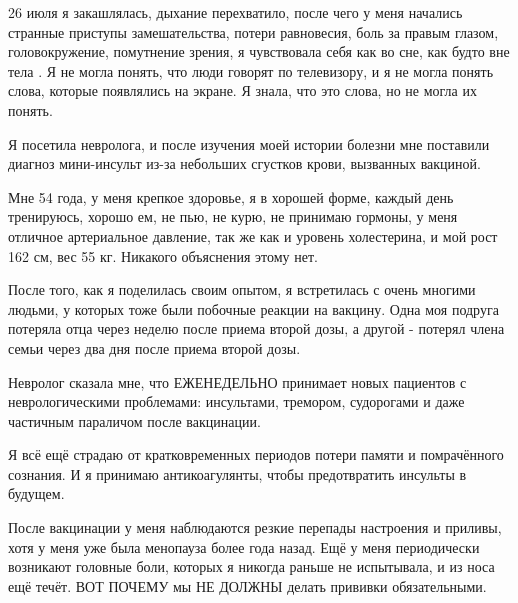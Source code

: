 26 июля я закашлялась, дыхание перехватило, после чего у меня начались странные
приступы замешательства, потери равновесия, боль за правым глазом,
головокружение, помутнение зрения, я чувствовала себя как во сне, как будто вне
тела . Я не могла понять, что люди говорят по телевизору, и я не могла понять
слова, которые появлялись на экране. Я знала, что это слова, но не могла их
понять.

Я посетила невролога, и после изучения моей истории болезни мне поставили
диагноз мини-инсульт из-за небольших сгустков крови, вызванных вакциной.

Мне 54 года, у меня крепкое здоровье, я в хорошей форме, каждый день тренируюсь,
хорошо ем, не пью, не курю, не принимаю гормоны, у меня отличное артериальное
давление, так же как и уровень холестерина, и мой рост 162 см, вес 55
кг. Никакого объяснения этому нет.

После того, как я поделилась своим опытом, я встретилась с очень многими людьми,
у которых тоже были побочные реакции на вакцину. Одна моя подруга потеряла отца
через неделю после приема второй дозы, а другой - потерял члена семьи через два
дня после приема второй дозы.

Невролог сказала мне, что ЕЖЕНЕДЕЛЬНО принимает новых пациентов с
неврологическими проблемами: инсультами, тремором, судорогами и даже частичным
параличом после вакцинации.

Я всё ещё страдаю от кратковременных периодов потери памяти и помрачённого
сознания. И я принимаю антикоагулянты, чтобы предотвратить инсульты в будущем.

После вакцинации у меня наблюдаются резкие перепады настроения и приливы, хотя у
меня уже была менопауза более года назад. Ещё у меня периодически возникают
головные боли, которых я никогда раньше не испытывала, и из носа ещё течёт. ВОТ
ПОЧЕМУ мы НЕ ДОЛЖНЫ делать прививки обязательными.
